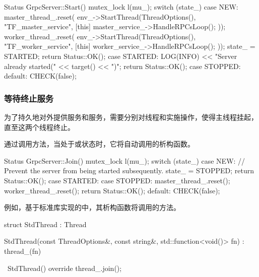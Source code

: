 \begin{content}
\begin{leftbar}
\begin{c++}
Status GrpcServer::Start() {
  mutex_lock l(mu_);
  switch (state_) {
    case NEW: {
      master_thread_.reset(
          env_->StartThread(ThreadOptions(), "TF_master_service",
                            [this] { master_service_->HandleRPCsLoop(); }));
      worker_thread_.reset(
          env_->StartThread(ThreadOptions(), "TF_worker_service",
                            [this] { worker_service_->HandleRPCsLoop(); }));
      state_ = STARTED;
      return Status::OK();
    }
    case STARTED:
      LOG(INFO) << "Server already started(" << target() << ")";    
      return Status::OK();
    case STOPPED:
    default:
      CHECK(false);
  }
}
\end{c++}
\end{leftbar}

\subsubsection{等待终止服务}

为了持久地对外提供服务和服务，需要分别对线程和实施操作，使得主线程挂起，直至这两个线程终止。

通过调用方法，当处于或状态时，它将自动调用的析构函数。

\begin{leftbar}
\begin{c++}
Status GrpcServer::Join() {
  mutex_lock l(mu_);
  switch (state_) {
    case NEW:
      // Prevent the server from being started subsequently.
      state_ = STOPPED;
      return Status::OK();
    case STARTED:
    case STOPPED:
      master_thread_.reset();
      worker_thread_.reset();
      return Status::OK();
    default:
      CHECK(false);
  }
}
\end{c++}
\end{leftbar}

例如，基于标准库实现的中，其析构函数将调用的方法。

\begin{leftbar}
\begin{c++}
struct StdThread : Thread {
  StdThread(const ThreadOptions&, const string&, 
      std::function<void()> fn)
    : thread_(fn) {
  }

  ~StdThread() override { 
    thread_.join(); 
  }

}
\end{c++}
\end{leftbar}
\end{content}
